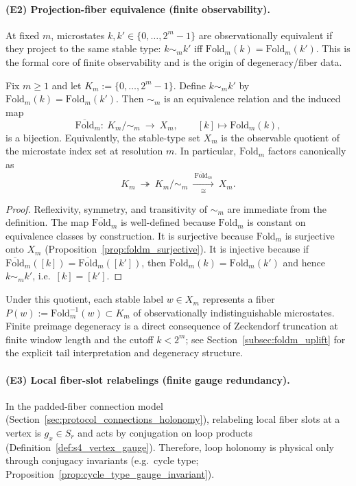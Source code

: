 \paragraph{(E2) Projection-fiber equivalence (finite observability).}
\MathTag At fixed $m$, microstates $k,k'\in\{0,\dots,2^m-1\}$ are observationally equivalent if they project to the same stable type:
$k\sim_m k'$ iff $\mathrm{Fold}_m(k)=\mathrm{Fold}_m(k')$.
This is the formal core of finite observability and is the origin of degeneracy/fiber data.
%
\begin{proposition}\label{prop:omega_quotient_equals_Xm}
\MathTag Fix $m\ge 1$ and let $K_m:=\{0,\dots,2^m-1\}$.
Define $k\sim_m k'$ by $\mathrm{Fold}_m(k)=\mathrm{Fold}_m(k')$.
Then $\sim_m$ is an equivalence relation and the induced map
\[
\overline{\mathrm{Fold}}_m:\ K_m/\!\sim_m\ \longrightarrow\ X_m,\qquad [k]\mapsto \mathrm{Fold}_m(k),
\]
is a bijection.
Equivalently, the stable-type set $X_m$ is the observable quotient of the microstate index set at resolution $m$.
In particular, $\mathrm{Fold}_m$ factors canonically as
\[
K_m\ \twoheadrightarrow\ K_m/\!\sim_m\ \xrightarrow[\cong]{\ \overline{\mathrm{Fold}}_m\ }\ X_m.
\]
\end{proposition}
\begin{proof}
Reflexivity, symmetry, and transitivity of $\sim_m$ are immediate from the definition.
The map $\overline{\mathrm{Fold}}_m$ is well-defined because $\mathrm{Fold}_m$ is constant on equivalence classes by construction.
It is surjective because $\mathrm{Fold}_m$ is surjective onto $X_m$ (Proposition~\ref{prop:foldm_surjective}).
It is injective because if $\overline{\mathrm{Fold}}_m([k])=\overline{\mathrm{Fold}}_m([k'])$, then $\mathrm{Fold}_m(k)=\mathrm{Fold}_m(k')$ and hence $k\sim_m k'$, i.e.\ $[k]=[k']$.
\end{proof}
\begin{remark}\label{rem:fold_fibers_residual_uncertainty}
\InterfaceTag Under this quotient, each stable label $w\in X_m$ represents a fiber $P(w):=\mathrm{Fold}_m^{-1}(w)\subset K_m$ of observationally indistinguishable microstates.
Finite preimage degeneracy is a direct consequence of Zeckendorf truncation at finite window length and the cutoff $k<2^m$; see Section~\ref{subsec:foldm_uplift} for the explicit tail interpretation and degeneracy structure.
\end{remark}

\paragraph{(E3) Local fiber-slot relabelings (finite gauge redundancy).}
\MathTag In the padded-fiber connection model (Section~\ref{sec:protocol_connections_holonomy}), relabeling local fiber slots at a vertex is $g_x\in S_r$ and acts by conjugation on loop products (Definition~\ref{def:s4_vertex_gauge}).
Therefore, loop holonomy is physical only through conjugacy invariants (e.g.\ cycle type; Proposition~\ref{prop:cycle_type_gauge_invariant}).

